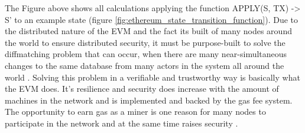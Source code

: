 The Figure above shows all calculations applying the function APPLY(S, TX) -> S' to an example state (figure \ref{fig:ethereum_state_transition_function}). Due to the distributed nature of the \ac{EVM} and the fact its built of many nodes around the world to ensure distributed security, it must be purpose-built to solve the diffmatching problem that can occur, when there are many near-simultaneous changes to the same database from many actors in the system all around the world . Solving this problem in a verifiable and trustworthy way is basically what the \ac{EVM} does. It's resilience and security does increase with the amount of machines in the network and is implemented and backed by the gas fee system. The opportunity to earn gas as a miner is one reason for many nodes to participate in the network and at the same time raises security \cite{dannen2017introducing}.


 
\clearpage


